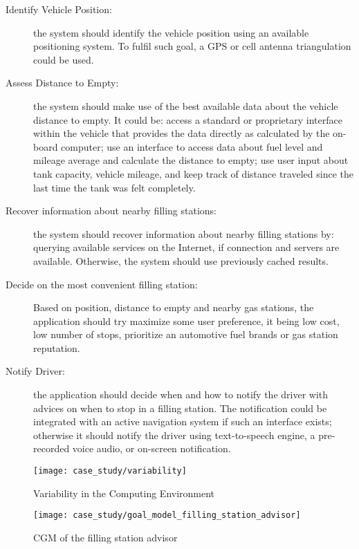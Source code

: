 \begin{description}
  \item[Identify Vehicle Position:]
  the system should identify the vehicle position using an available positioning system. To fulfil such goal, a GPS or cell antenna triangulation could be used.

  \item[Assess Distance to Empty:]
  the system should make use of the best available data about the vehicle distance to empty. It could be: access a standard or proprietary interface within the vehicle that provides the data directly as calculated by the on-board computer; use an interface to access data about fuel level and mileage average and calculate the distance to empty; use user input about tank capacity, vehicle mileage, and keep track of distance traveled since the last time the tank was felt completely.

  \item[Recover information about nearby filling stations:]
  the system should recover information about nearby filling stations by: querying available services on the Internet, if connection and servers are available. Otherwise, the system should use previously cached results.

  \item[Decide on the most convenient filling station:]
  Based on position, distance to empty and nearby gas stations, the application should try maximize some user preference, it being low cost, low number of stops, prioritize an automotive fuel brands or gas station reputation.

  \item[Notify Driver:] the application should decide when and how to notify the driver with advices on when to stop in a filling station. The notification could be integrated with an active navigation system if such an interface exists; otherwise it should notify the driver using text-to-speech engine, a pre-recorded voice audio, or on-screen notification.

\end{description}

\begin{figure}[!htb]
 \centering
 \texttt{[image: case\_study/variability]}
 \caption{Variability in the Computing Environment}
\label{fig:variability}
\end{figure}

\begin{figure*}[!htb]
 \centering
 \texttt{[image: case\_study/goal\_model\_filling\_station\_advisor]}
 \caption{CGM of the filling station advisor}
\label{fig:goal_model_filling_station_advisor}
\end{figure*}
